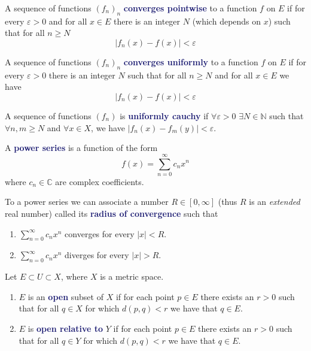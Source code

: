 \documentclass[11pt]{article}
\numberwithin{equation}{section}
\newcommand{\navy}[1]{\textcolor{MidnightBlue}{\bf #1}}
\theoremstyle{definition}
\theoremstyle{definition}
\newcommand{\1}{\mathbbm 1}
\newcommand{\e}{\varepsilon}
\newcommand{\CC}{\mathbb C}
\newcommand{\NN}{\mathbb N}
\begin{document}
\begin{definition}
A sequence of functions $(f_n)_n$ \navy{converges pointwise} to a function $f$ on $E$ if for every $\e > 0$ and for all $x \in E$ there is an integer $N$ (which depends on $x$) such that for all $n \geq N$
\begin{equation*}
|f_n(x) - f(x)| < \e
\end{equation*}
\end{definition}

\begin{definition}
A sequence of functions $(f_n)_n$ \navy{converges uniformly} to a function $f$ on $E$ if for every $\e > 0$ there is an integer $N$ such that for all $n \geq N$ and for all $x \in E$ we have
\begin{equation*}
|f_n(x) - f(x)| < \e
\end{equation*}
\end{definition}

\begin{definition}
A sequence of functions $(f_n)$ is \navy{uniformly cauchy} if $\forall \e > 0$ $\exists N \in \NN$ such that $\forall n,m \geq N$ and $\forall x \in X$, we have $|f_n(x) - f_m(y)| < \e$.
\end{definition}

\begin{definition}
A \navy{power series} is a function of the form
\begin{equation}
f(x) = \sum_{n=0}^\infty c_n x^n
\end{equation}
where $c_n \in \CC$ are complex coefficients.
\end{definition}

\begin{definition}
To a power series we can associate a number $R \in [0, \infty]$ (thus $R$ is an \emph{extended} real number) called its \navy{radius of convergence} such that
\begin{enumerate}
\item $\sum_{n=0}^\infty c_n x^n$ converges for every $|x| < R$.
\item $\sum_{n=0}^\infty c_n x^n$ diverges for every $|x| > R$.
\end{enumerate}
\end{definition}

\begin{definition}
Let $E \subset U \subset X$, where $X$ is a metric space.
\begin{enumerate}
\item $E$ is an \navy{open} subset of $X$ if for each point $p \in E$ there exists an $r > 0$ such that for all $q \in X$ for which $d(p,q) < r$ we have that $q \in E$.
\item $E$ is \navy{open relative to} $Y$ if for each point $p \in E$ there exists an $r > 0$ such that for all $q \in Y$ for which $d(p,q) < r$ we have that $q \in E$.
\end{enumerate}
\end{definition}
\end{document}
